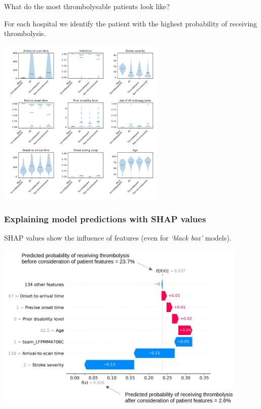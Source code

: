 \documentclass{beamer}
\begin{document}

\begin{frame}{What do the most thrombolysable patients look like?}

For each hospital we identify the patient with the highest probability of receiving thrombolysis.

\begin{center}
\includegraphics[width=0.6\textwidth]{./images/02a_most_thrombolsyable_violin.jpg}
\end{center}

\end{frame}






\begin{frame}
\frametitle{Explaining model predictions with SHAP values}

SHAP values show the influence of features (even for \emph{`black box'} models).

\begin{center}
\includegraphics[width=0.90\textwidth]{./images/waterfall.jpg}
\end{center}
\end{frame}
\end{document}
